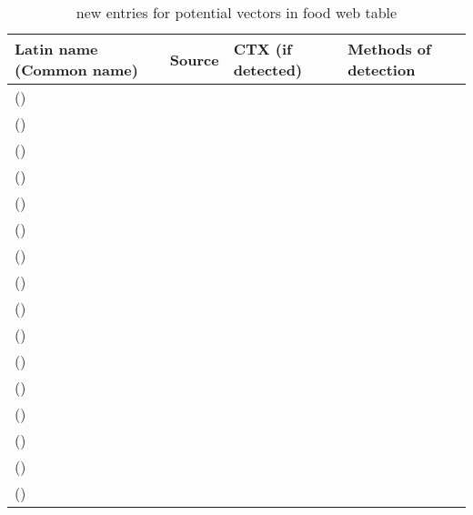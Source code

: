 \documentclass[12pt]{article}
\begin{document}

\begin{table}
\caption{new entries for potential vectors in food web table}
\begin{tabular}{ | p{3cm} | p{4.5cm} | p{2.95cm} | p{3.95cm} | }
\hline
\textbf{Latin name (Common name)} & \textbf{Source} & \textbf{CTX (if detected)} & \textbf{Methods of detection} \\
\hline
 \emph{} () &  &  & \\
\hline
 \emph{} ()  &  &  & \\
\hline
  \emph{} () &  &  & \\
\hline
 \emph{} () &  &  & \\
\hline
  \emph{} () &  &  & \\
\hline
  \emph{} () &  &  & \\
\hline
  \emph{} () &  &  & \\
\hline
  \emph{} () &  &  & \\
\hline
 \emph{} ()  &  &  & \\
\hline
 \emph{} ()  &  &  & \\
\hline
  \emph{} () &  &  & \\
\hline
  \emph{} () &  &  & \\
\hline
  \emph{} () &  &  & \\
\hline
  \emph{} () &  &  & \\
\hline
 \emph{} ()  &  &  & \\
\hline
  \emph{} () &  &  & \\
\hline
\end{tabular}
\end{table}
\end{document}
